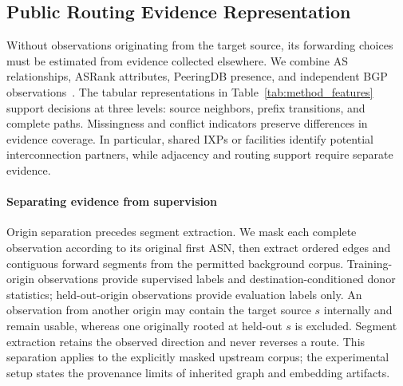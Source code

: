 \subsection{Public Routing Evidence Representation}
\label{sec:representation}

Without observations originating from the target source, its forwarding
choices must be estimated from evidence collected elsewhere. We combine
AS relationships, ASRank attributes, PeeringDB presence, and independent
BGP observations~\cite{CAIDA,caidaASrank,PeeringDB}. The tabular
representations in Table~\ref{tab:method_features} support decisions at
three levels: source neighbors, prefix transitions, and complete paths.
Missingness and conflict indicators preserve differences in evidence
coverage. In particular, shared IXPs or facilities identify potential
interconnection partners, while adjacency and routing support require
separate evidence.



\paragraph{Separating evidence from supervision}
Origin separation precedes segment extraction. We mask each complete
observation according to its original first ASN, then extract ordered
edges and contiguous forward segments from the permitted background
corpus. Training-origin observations provide supervised labels and
destination-conditioned donor statistics; held-out-origin observations
provide evaluation labels only. An observation from another origin may
contain the target source $s$ internally and remain usable, whereas one
originally rooted at held-out $s$ is excluded. Segment extraction retains
the observed direction and never reverses a route. This separation
applies to the explicitly masked upstream corpus; the experimental setup
states the provenance limits of inherited graph and embedding artifacts.

